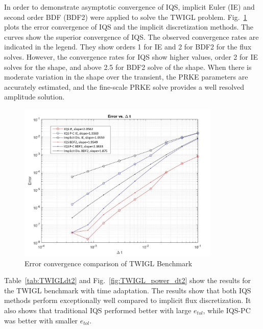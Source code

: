 \documentclass{elsarticle}
\newcommand{\fig}[1]{Fig.~\ref{#1}}                      %
\newcommand{\tbl}[1]{Table~\ref{#1}}                     %
\newcommand{\iqspc}{IQS-PC\xspace}
\begin{document}

In order to demonstrate asymptotic convergence of IQS, implicit Euler (IE) and second order BDF (BDF2) were applied to solve the TWIGL problem. \fig{fig:TWIGL_conv} plots the error convergence of IQS and the implicit discretization methods.  The curves show the superior convergence of IQS. The observed convergence rates are indicated in the legend.
They show orders 1 for IE and 2 for BDF2 for the flux solves. However, the convergence rates for IQS show higher values,
order 2 for IE solves for the shape, and above 2.5 for BDF2 solve of the shape. When there is moderate variation in the shape over the transient, the PRKE parameters are accurately estimated, and the fine-scale PRKE solve provides a well resolved amplitude solution.

\begin{figure}[!htbp]
\centering
\includegraphics[height=3in]{figures/TWIGL_convergence.jpg}
\caption{Error convergence comparison of TWIGL Benchmark}
\label{fig:TWIGL_conv}
\end{figure}


\tbl{tab:TWIGLdt2} and \fig{fig:TWIGL_power_dt2} show the results for the TWIGL benchmark with time adaptation.  The results show that both IQS methods perform exceptionally well compared to implicit flux discretization.  It also shows that traditional IQS performed better with large $e_{tol}$, while \iqspc was better with smaller $e_{tol}$.
\end{document}
